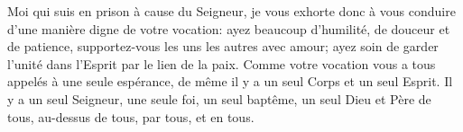 Moi qui suis en prison à cause du Seigneur,
	je vous exhorte donc à vous conduire d’une manière digne de votre vocation:
	ayez beaucoup d’humilité, de douceur et de patience,
	supportez-vous les uns les autres avec amour;
	ayez soin de garder l’unité dans l’Esprit par le lien de la paix.
Comme votre vocation vous a tous appelés à une seule espérance,
	de même il y a un seul Corps et un seul Esprit.
Il y a un seul Seigneur, une seule foi, un seul baptême,
	un seul Dieu et Père de tous, au-dessus de tous, par tous, et en tous.
